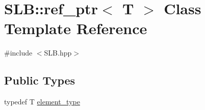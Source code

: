 \hypertarget{classSLB_1_1ref__ptr}{}\section{S\+LB\+:\+:ref\+\_\+ptr$<$ T $>$ Class Template Reference}
\label{classSLB_1_1ref__ptr}


{\ttfamily \#include $<$S\+L\+B.\+hpp$>$}

\subsection*{Public Types}
\begin{DoxyCompactItemize}
\item 
typedef T \hyperlink{classSLB_1_1ref__ptr_a967e377b06e2f0d4acf989581c2222d5}{element\+\_\+type}
\end{DoxyCompactItemize}
